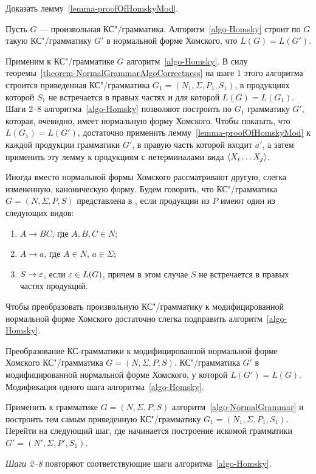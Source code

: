 \begin{myproblem}
Доказать лемму~\ref{lemma-proofOfHomskyMod}.
\end{myproblem}

\begin{mytheorem}
\label{theorem-AlgoHomskyProof}
Пусть $G$ --- произвольная КС"/грамматика. Алгоритм~\ref{algo-Homsky} строит по $G$ такую КС"/грамматику $G'$ в нормальной форме Хомского, что $L(G)=L(G')$.
\end{mytheorem}



\begin{myproof}
Применим к КС"/грамматике $G$ алгоритм~\ref{algo-Homsky}. В силу теоремы~\ref{theorem-NormalGrammarAlgoCorrectness} на шаге 1 этого алгоритма строится приведенная КС"/грамматика $G_1=(N_1,\Sigma, P_1, S_1)$, в продукциях которой $S_1$ не встречается в правых частях и для которой $L(G)=L(G_1)$. Шаги 2--8 алгоритма~\ref{algo-Homsky} позволяют построить по $G_1$ грамматику $G'$, которая, очевидно, имеет нормальную форму Хомского. Чтобы показать, что $L(G_1)=L(G')$, достаточно применить лемму~\ref{lemma-proofOfHomskyMod} к каждой продукции грамматики $G'$, в правую часть которой входит $a'$, а затем применить эту лемму к продукциям с нетерминалами вида $\langle X_i\ldots X_j \rangle$.
\end{myproof}

Иногда вместо нормальной формы Хомского рассматривают другую, слегка
измененную, каноническую форму. Будем говорить, что КС"/грамматика
$G=(N,\Sigma,P,S)$ представлена в , если продукции из $P$ имеют один из следующих видов:
\begin{enumerate}
    \item $A\to BC$, где $A,B,C\in N$;
    \item $A\to a$, где $A\in N$, $a\in\Sigma$;
    \item $S\to\varepsilon$, если $\varepsilon\in L(G)$, причем в этом случае
    $S$ не встречается в правых частях продукций.
\end{enumerate}

Чтобы преобразовать произвольную КС"/грамматику к модифицированной нормальной форме Хомского достаточно слегка подправить алгоритм~\ref{algo-Homsky}.

\begin{Algo}
{Преобразование КС-грамматики к модифицированной нормальной форме Хомского}
{\label{algo-Homsky-Mod}КС"/грамматика $G=(N,\Sigma,P,S)$.}
{КС"/грамматика $G'$ в модифицированной нормальной форме Хомского, у которой $L(G')=L(G)$.}
{Модификация одного шага алгоритма~\ref{algo-Homsky}.}
{
\item
 Применить к грамматике $G=(N,\Sigma,P,S)$ алгоритм~\ref{algo-NormalGrammar} и построить тем самым приведенную КС"/грамматику $G_1=(N_1,\Sigma,P_1,S_1)$. Перейти на следующий шаг, где начинается построение искомой грамматики $G'=(N',\Sigma,P',S_1)$.

\item[\textit{Шаги 2--8}]
 повторяют соответствующие шаги алгоритма~\ref{algo-Homsky}.
}
\end{Algo}

